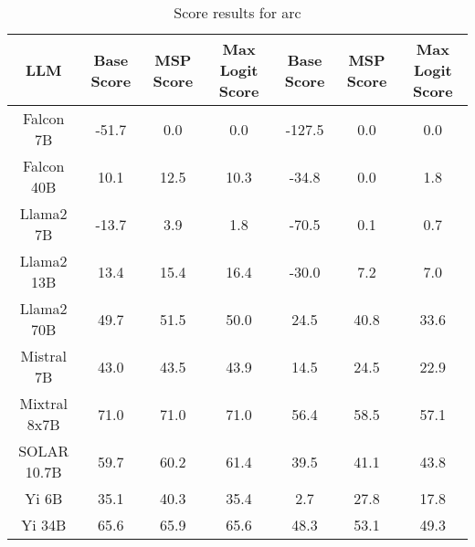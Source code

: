 \renewcommand\arraystretch{1.2}
\begin{table*}
\centering
\begin{tabular}{c|c|c|c|c|c|c}
LLM & Base Score & MSP Score & Max Logit Score & Base Score & MSP Score & Max Logit Score\\ \hline
Falcon 7B & -51.7 & 0.0 & 0.0 & -127.5 & 0.0 & 0.0\\
Falcon 40B & 10.1 & 12.5 & 10.3 & -34.8 & 0.0 & 1.8\\
Llama2 7B & -13.7 & 3.9 & 1.8 & -70.5 & 0.1 & 0.7\\
Llama2 13B & 13.4 & 15.4 & 16.4 & -30.0 & 7.2 & 7.0\\
Llama2 70B & 49.7 & 51.5 & 50.0 & 24.5 & 40.8 & 33.6\\
Mistral 7B & 43.0 & 43.5 & 43.9 & 14.5 & 24.5 & 22.9\\
Mixtral 8x7B & 71.0 & 71.0 & 71.0 & 56.4 & 58.5 & 57.1\\
SOLAR 10.7B & 59.7 & 60.2 & 61.4 & 39.5 & 41.1 & 43.8\\
Yi 6B & 35.1 & 40.3 & 35.4 & 2.7 & 27.8 & 17.8\\
Yi 34B & 65.6 & 65.9 & 65.6 & 48.3 & 53.1 & 49.3\\
\hline
\end{tabular}
\caption{Score results for arc}
\end{table*}
\label{tab:arc_score}
